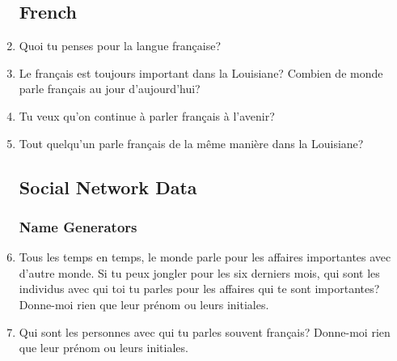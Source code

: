 \begin{enumerate}
  \subsection{French}
    \item Quoi tu penses pour la langue française?
    \item Le français est toujours important dans la Louisiane? Combien de monde parle français au jour d'aujourd'hui?
    \item Tu veux qu'on continue à parler français à l'avenir?
    \item Tout quelqu'un parle français de la même manière dans la Louisiane?
  \subsection{Social Network Data}
    \subsubsection{Name Generators}
    \item Tous les temps en temps, le monde parle pour les affaires importantes avec d'autre monde. Si tu peux jongler pour les six derniers mois, qui sont les individus avec qui toi tu parles pour les affaires qui te sont importantes? Donne-moi rien que leur prénom ou leurs initiales.\\
    \item Qui sont les personnes avec qui tu parles souvent français? Donne-moi rien que leur prénom ou leurs initiales.\\

\end{enumerate}
